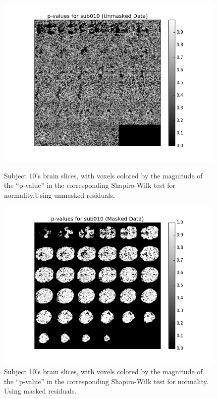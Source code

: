 \begin{figure}[ht]
\centering
\begin{minipage}[b]{0.45\linewidth}
	\centering
	\includegraphics[width=.8\linewidth]{../images/sub010sw.png} 
	\caption{Subject 10's brain slices, with voxels colored by the magnitude of the
``p-value'' in the corresponding Shapiro-Wilk test for normality.Using unmasked residuals.}
\label{fig:sw}
\end{minipage}	
\quad
\begin{minipage}[b]{0.45\linewidth}
	\centering
		\includegraphics[width=.8\linewidth]{../images/sub010swmasked.png} 
	\caption{Subject 10's brain slices, with voxels colored by the magnitude of the
``p-value'' in the corresponding Shapiro-Wilk test for normality. Using masked residuals.}
\label{fig:sw_masked}
\end{minipage}
\end{figure}
